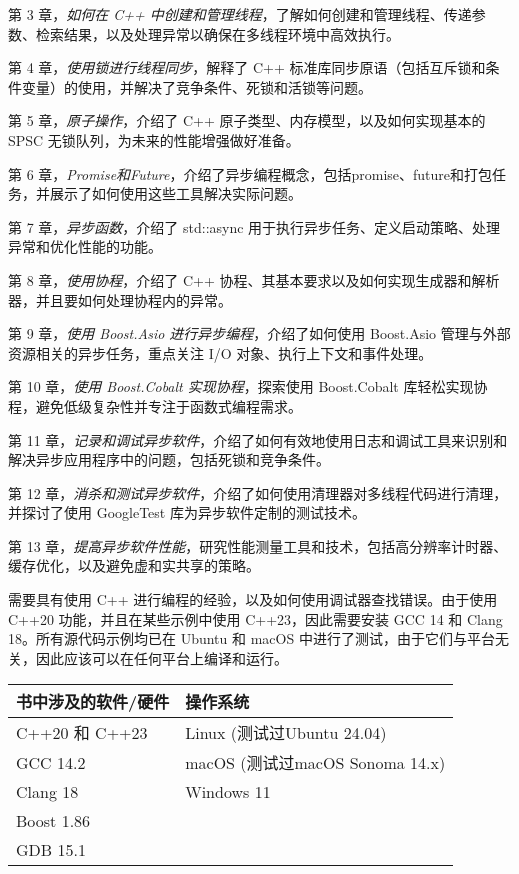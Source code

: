 第 3 章，\textit{如何在 C++ 中创建和管理线程}，了解如何创建和管理线程、传递参数、检索结果，以及处理异常以确保在多线程环境中高效执行。

第 4 章，\textit{使用锁进行线程同步}，解释了 C++ 标准库同步原语（包括互斥锁和条件变量）的使用，并解决了竞争条件、死锁和活锁等问题。

第 5 章，\textit{原子操作}，介绍了 C++ 原子类型、内存模型，以及如何实现基本的 SPSC 无锁队列，为未来的性能增强做好准备。

第 6 章，\textit{Promise和Future}，介绍了异步编程概念，包括promise、future和打包任务，并展示了如何使用这些工具解决实际问题。

第 7 章，\textit{异步函数}，介绍了 std::async 用于执行异步任务、定义启动策略、处理异常和优化性能的功能。

第 8 章，\textit{使用协程}，介绍了 C++ 协程、其基本要求以及如何实现生成器和解析器，并且要如何处理协程内的异常。

第 9 章，\textit{使用 Boost.Asio 进行异步编程}，介绍了如何使用 Boost.Asio 管理与外部资源相关的异步任务，重点关注 I/O 对象、执行上下文和事件处理。

第 10 章，\textit{使用 Boost.Cobalt 实现协程}，探索使用 Boost.Cobalt 库轻松实现协程，避免低级复杂性并专注于函数式编程需求。

第 11 章，\textit{记录和调试异步软件}，介绍了如何有效地使用日志和调试工具来识别和解决异步应用程序中的问题，包括死锁和竞争条件。

第 12 章，\textit{消杀和测试异步软件}，介绍了如何使用清理器对多线程代码进行清理，并探讨了使用 GoogleTest 库为异步软件定制的测试技术。

第 13 章，\textit{提高异步软件性能}，研究性能测量工具和技术，包括高分辨率计时器、缓存优化，以及避免虚和实共享的策略。



需要具有使用 C++ 进行编程的经验，以及如何使用调试器查找错误。由于使用 C++20 功能，并且在某些示例中使用 C++23，因此需要安装 GCC 14 和 Clang 18。所有源代码示例均已在 Ubuntu 和 macOS 中进行了测试，由于它们与平台无关，因此应该可以在任何平台上编译和运行。

\begin{longtable}{|l|l|}
\hline
\textbf{书中涉及的软件/硬件} & \textbf{操作系统}                \\ \hline
\endfirsthead
%
\endhead
%
C++20 和 C++23       & Linux (测试过Ubuntu 24.04)      \\ \hline
GCC 14.2            & macOS (测试过macOS Sonoma 14.x) \\ \hline
Clang 18            & Windows 11                   \\ \hline
Boost 1.86          &                              \\ \hline
GDB 15.1            &                              \\ \hline
\end{longtable}

